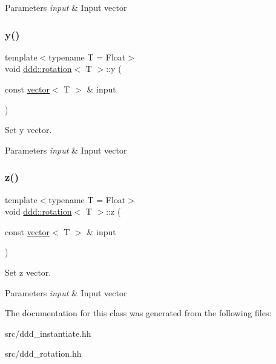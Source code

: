 \begin{DoxyParams}{Parameters}
{\em input} & Input vector \\
\hline
\end{DoxyParams}
\mbox{\label{classddd_1_1rotation_aeb1179a75b15819f424d212d9b09d818}} 
\subsubsection{\texorpdfstring{y()}{y()}}
{\footnotesize\ttfamily template$<$typename T  = Float$>$ \\
void \hyperlink{classddd_1_1rotation}{ddd\+::rotation}$<$ T $>$\+::y (\begin{DoxyParamCaption}\item[{const \hyperlink{classddd_1_1vector}{vector}$<$ T $>$ \&}]{input }\end{DoxyParamCaption})\hspace{0.3cm}{\ttfamily [inline]}}



Set y vector. 


\begin{DoxyParams}{Parameters}
{\em input} & Input vector \\
\hline
\end{DoxyParams}
\mbox{\label{classddd_1_1rotation_add5659b127f52c0796f8eaa5997d9e20}} 
\subsubsection{\texorpdfstring{z()}{z()}}
{\footnotesize\ttfamily template$<$typename T  = Float$>$ \\
void \hyperlink{classddd_1_1rotation}{ddd\+::rotation}$<$ T $>$\+::z (\begin{DoxyParamCaption}\item[{const \hyperlink{classddd_1_1vector}{vector}$<$ T $>$ \&}]{input }\end{DoxyParamCaption})\hspace{0.3cm}{\ttfamily [inline]}}



Set z vector. 


\begin{DoxyParams}{Parameters}
{\em input} & Input vector \\
\hline
\end{DoxyParams}


The documentation for this class was generated from the following files\+:\begin{DoxyCompactItemize}
\item 
src/ddd\+\_\+instantiate.\+hh\item 
src/ddd\+\_\+rotation.\+hh\end{DoxyCompactItemize}
